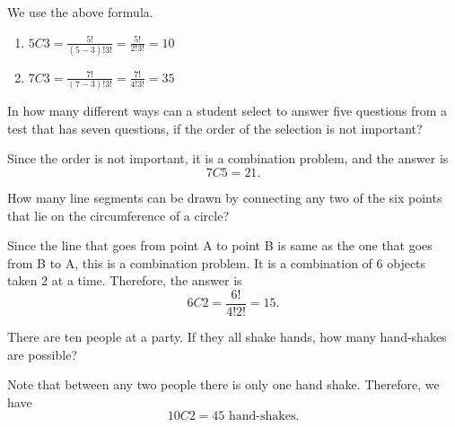 \begin{solution}
    We use the above formula.
    \begin{enumerate}
        \item \(5C3 = \frac{5!}{(5-3)!3!} = \frac{5!}{2!3!} = 10 \)
        \item \(7C3 = \frac{7!}{(7-3)!3!} = \frac{7!}{4!3!} = 35 \)
    \end{enumerate}
\end{solution}

\begin{example}
    In how many different ways can a student select to answer five questions from a test that has seven questions, if the order of the selection is not important?
\end{example}
\begin{solution}
    Since the order is not important, it is a combination problem, and the answer is
    \[ 7C5 = 21. \]
\end{solution}

\begin{example}
    How many line segments can be drawn by connecting any two of the six points that lie on the circumference of a circle?
\end{example}
\begin{solution}
    Since the line that goes from point A to point B is same as the one that goes from B to A, this is a combination problem.
    It is a combination of 6 objects taken 2 at a time. Therefore, the answer is
    \[ 6C2 = \frac{6!}{4!2!} = 15. \]
\end{solution}

\begin{example}
    There are ten people at a party. If they all shake hands, how many hand-shakes are possible?
\end{example}
\begin{solution}
    Note that between any two people there is only one hand shake. Therefore, we have
    \[ 10C2 = 45 \text{ hand-shakes.} \]
\end{solution}

